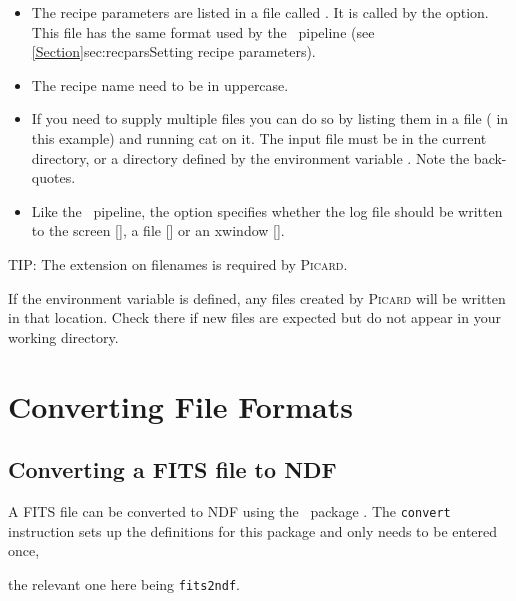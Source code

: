 \documentclass[11pt,oneside,chapters]{starlink}
\begin{document}
\begin{itemize}
\item The recipe parameters are listed in a file called .
It is called by the  option. This file has the same
 format used by the \ORACDR\ pipeline (see
\cref{Section}{sec:recpars}{Setting recipe parameters}).
\item The recipe name need to be in uppercase.
\item If you need to supply multiple files you can do so by listing
them in a file ( in this example) and running cat on it.
The input file must be in the current directory, or a directory
defined by the environment variable . Note the
back-quotes.
\item Like the \ORACDR\ pipeline, the  option specifies
whether the log file should be written to the screen [], a
file [] or an xwindow [].
\end{itemize}

\begin{tip}
TIP: The  extension on filenames is required by \textsc{Picard}.
\end{tip}

\begin{tip}
If the environment variable  is defined, any files
created by \textsc{Picard} will be written in that location. Check there if new
files are expected but do not appear in your working directory.
\end{tip}

\newpage
\chapter{Converting File Formats}
\label{app:convert}

\section{Converting a FITS file to NDF}

A FITS file can be converted to NDF using the \starlink\ package
\convert.  The \texttt{convert} instruction sets up the definitions
for this package and only needs to be entered once,

\begin{terminalv}
\end{terminalv}

the relevant one here being \texttt{fits2ndf}.
\end{document}
